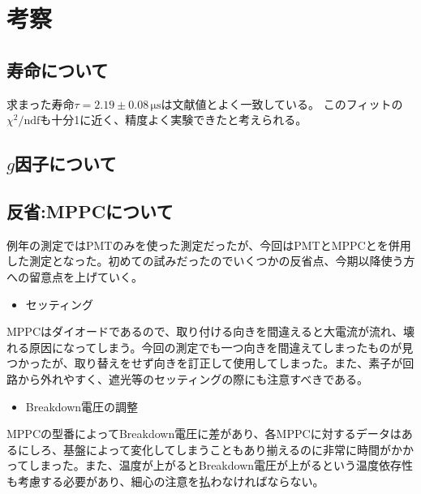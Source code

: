 \section{考察}
\subsection{寿命について}
求まった寿命$\tau= 2.19 \pm 0.08\,\mathrm{\mu s}$は文献値とよく一致している。
このフィットの$\chi^2 / \mathrm{ndf}$も十分1に近く、精度よく実験できたと考えられる。

\subsection{$g$因子について}



\subsection{反省:MPPCについて}
例年の測定ではPMTのみを使った測定だったが、今回はPMTとMPPCとを併用した測定となった。初めての試みだったのでいくつかの反省点、今期以降使う方への留意点を上げていく。
\begin{itemize}
\item セッティング
\end{itemize}
MPPCはダイオードであるので、取り付ける向きを間違えると大電流が流れ、壊れる原因になってしまう。今回の測定でも一つ向きを間違えてしまったものが見つかったが、取り替えをせず向きを訂正して使用してしまった。また、素子が回路から外れやすく、遮光等のセッティングの際にも注意すべきである。
\begin{itemize}
\item Breakdown電圧の調整
\end{itemize}
MPPCの型番によってBreakdown電圧に差があり、各MPPCに対するデータはあるにしろ、基盤によって変化してしまうこともあり‎揃えるのに非常に時間がかかってしまった。また、温度が上がるとBreakdown電圧が上がるという温度依存性も考慮する必要があり、細心の注意を払わなければならない。
